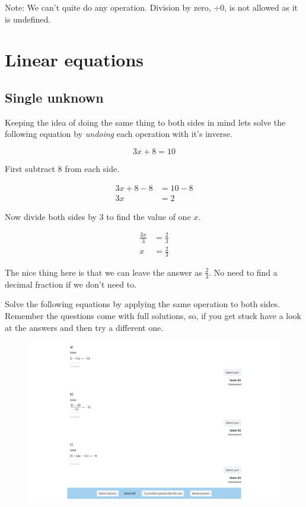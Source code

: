 \documentclass[
  a4paper,
]{scrbook}
\begin{document}
Note: We can't quite do any operation. Division by zero, \(\div 0\), is
not allowed as it is undefined.

\hypertarget{linear-equations}{%
\section{Linear equations}\label{linear-equations}}

\hypertarget{single-unknown}{%
\subsection{Single unknown}\label{single-unknown}}

Keeping the idea of doing the same thing to both sides in mind lets
solve the following equation by \emph{undoing} each operation with it's
inverse.

\[
3x + 8 = 10
\]

First subtract \(8\) from each side.

\[
\begin{aligned} 3x+8 -8 &= 10 -8 \\
3x &= 2
\end{aligned}
\]

Now divide both sides by \(3\) to find the value of one \(x\).

\[
\begin{aligned} \frac{3x}{3} &= \frac{2}{3} \\
x &= \frac{2}{3}
\end{aligned}
\]

The nice thing here is that we can leave the answer as \(\frac{2}{3}\).
No need to find a decimal fraction if we don't need to.

Solve the following equations by applying the same operation to both
sides. Remember the questions come with full solutions, so, if you get
stuck have a look at the answers and then try a different one.

\begin{figure}

{\centering 

\href{https://numbas.mathcentre.ac.uk/question/90637/equations-linear-equations-1a-rational-answers/embed/?token=8b0eebe4-9011-49a1-a3aa-d0a1298634be}{\includegraphics{./05-solving_equations_files/figure-pdf/unnamed-chunk-1-1.png}}

}

\end{figure}
\end{document}
